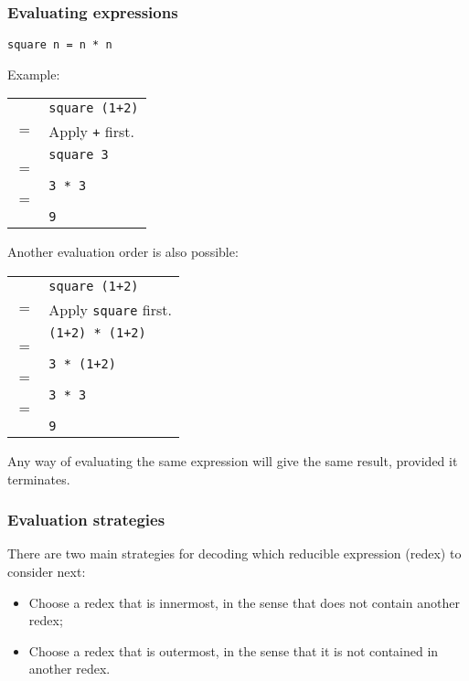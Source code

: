 \begin{multicols}{2}
\subsubsection{Evaluating expressions}
\begin{lstlisting}
square n = n * n
\end{lstlisting}

Example:
\begin{tabularx}{\linewidth}{lX}
  & \lstinline{square (1+2)}\\
  \(=\) & \tiny{Apply \lstinline{+} first.}\\
  & \lstinline{square 3}\\
  \(=\) & \\
  & \lstinline{3 * 3}\\
  \(=\) & \\
  & \lstinline{9}\\
\end{tabularx}

Another evaluation order is also possible:
\begin{tabularx}{\linewidth}{lX}
  & \lstinline{square (1+2)}\\
  \(=\) & \tiny{Apply \lstinline{square} first.}\\
  & \lstinline{(1+2) * (1+2)}\\
  \(=\) & \\
  & \lstinline{3 * (1+2)}\\
  \(=\) & \\
  & \lstinline{3 * 3}\\
  \(=\) & \\
  & \lstinline{9}\\
\end{tabularx}

Any way of evaluating the same expression will give the same result, provided it terminates.

\subsubsection{Evaluation strategies}
There are two main strategies for decoding which reducible expression (redex) to consider next:
\begin{itemize}
  \item Choose a redex that is innermost, in the sense that does not contain another redex;
  \item Choose a redex that is outermost, in the sense that it is not contained in another redex.
\end{itemize}


\end{multicols}
